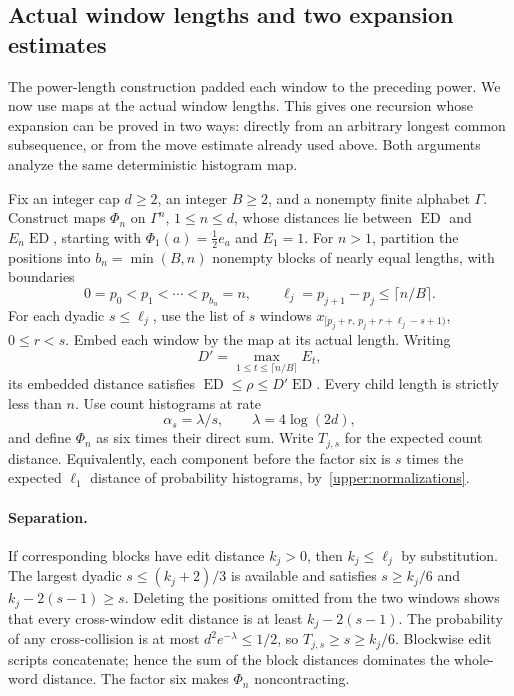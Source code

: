 \subsection{Actual window lengths and two expansion estimates}
\label{upper:variants}\label{upper:aligned}

The power-length construction padded each window to the preceding power.
We now use maps at the actual window lengths. This gives one recursion
whose expansion can be proved in two ways: directly from an arbitrary
longest common subsequence, or from the move estimate already used above.
Both arguments analyze the same deterministic histogram map.

Fix an integer cap $d\ge2$, an integer $B\ge2$, and a nonempty finite
alphabet $\Gamma$. Construct maps $\Phi_n$ on $\Gamma^n$, $1\le n\le d$,
whose distances lie between $\operatorname{ED}$ and
$E_n\operatorname{ED}$, starting with $\Phi_1(a)=\tfrac12e_a$ and $E_1=1$.
For $n>1$, partition the positions into $b_n=\min(B,n)$ nonempty blocks
of nearly equal lengths, with boundaries
\[
 0=p_0<p_1<\cdots<p_{b_n}=n,\qquad
 \ell_j=p_{j+1}-p_j\le\lceil n/B\rceil.
\]
For each dyadic $s\le\ell_j$, use the list of $s$ windows
$x_{[p_j+r,\,p_j+r+\ell_j-s+1)}$, $0\le r<s$.
Embed each window by the map at its actual length. Writing
\[
 D'=\max_{1\le t\le\lceil n/B\rceil}E_t,
\]
its embedded distance satisfies
$\operatorname{ED}\le\rho\le D'\operatorname{ED}$.
Every child length is strictly less than $n$. Use count histograms at rate
\begin{equation}\label{upper:aligned-rate}
 \alpha_s=\lambda/s,\qquad \lambda=4\log(2d),
\end{equation}
and define $\Phi_n$ as six times their direct sum. Write $T_{j,s}$ for
the expected count distance. Equivalently, each component before the factor
six is $s$ times the expected $\ell_1$ distance of probability histograms,
by~\eqref{upper:normalizations}.

\paragraph{Separation.}
If corresponding blocks have edit distance $k_j>0$, then
$k_j\le\ell_j$ by substitution. The largest dyadic
$s\le(k_j+2)/3$ is available and satisfies $s\ge k_j/6$ and
$k_j-2(s-1)\ge s$. Deleting the positions omitted from the two windows
shows that every cross-window edit distance is at least
$k_j-2(s-1)$. The probability of any cross-collision is at most
$d^2e^{-\lambda}\le1/2$, so $T_{j,s}\ge s\ge k_j/6$.
Blockwise edit scripts concatenate; hence the sum of the block distances
dominates the whole-word distance. The factor six makes $\Phi_n$
noncontracting.

